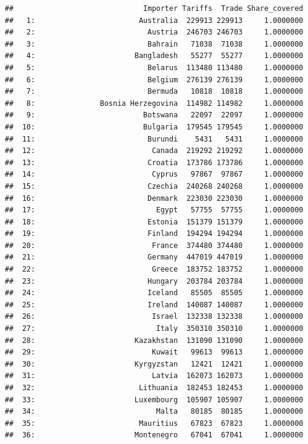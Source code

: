 \documentclass[10pt,]{article}
\begin{document}
\begin{verbatim}
##                              Importer Tariffs  Trade Share_covered
##   1:                        Australia  229913 229913     1.0000000
##   2:                          Austria  246703 246703     1.0000000
##   3:                          Bahrain   71038  71038     1.0000000
##   4:                       Bangladesh   55277  55277     1.0000000
##   5:                          Belarus  113480 113480     1.0000000
##   6:                          Belgium  276139 276139     1.0000000
##   7:                          Bermuda   10818  10818     1.0000000
##   8:               Bosnia Herzegovina  114982 114982     1.0000000
##   9:                         Botswana   22097  22097     1.0000000
##  10:                         Bulgaria  179545 179545     1.0000000
##  11:                          Burundi    5431   5431     1.0000000
##  12:                           Canada  219292 219292     1.0000000
##  13:                          Croatia  173786 173786     1.0000000
##  14:                           Cyprus   97867  97867     1.0000000
##  15:                          Czechia  240268 240268     1.0000000
##  16:                          Denmark  223030 223030     1.0000000
##  17:                            Egypt   57755  57755     1.0000000
##  18:                          Estonia  151379 151379     1.0000000
##  19:                          Finland  194294 194294     1.0000000
##  20:                           France  374480 374480     1.0000000
##  21:                          Germany  447019 447019     1.0000000
##  22:                           Greece  183752 183752     1.0000000
##  23:                          Hungary  203784 203784     1.0000000
##  24:                          Iceland   85505  85505     1.0000000
##  25:                          Ireland  140087 140087     1.0000000
##  26:                           Israel  132338 132338     1.0000000
##  27:                            Italy  350310 350310     1.0000000
##  28:                       Kazakhstan  131090 131090     1.0000000
##  29:                           Kuwait   99613  99613     1.0000000
##  30:                       Kyrgyzstan   12421  12421     1.0000000
##  31:                           Latvia  162073 162073     1.0000000
##  32:                        Lithuania  182453 182453     1.0000000
##  33:                       Luxembourg  105907 105907     1.0000000
##  34:                            Malta   80185  80185     1.0000000
##  35:                        Mauritius   67823  67823     1.0000000
##  36:                       Montenegro   67041  67041     1.0000000

\end{verbatim}
\end{document}
